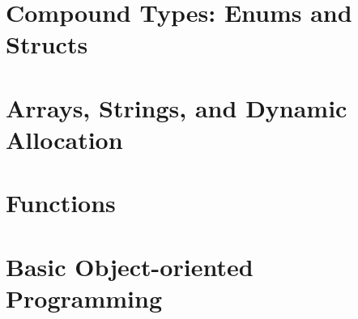 \documentclass[UTF8]{ctexart}
\begin{document}
\newpage

\section{Compound Types: Enums and Structs}












\newpage

\section{Arrays, Strings, and Dynamic Allocation}















\newpage

\section{Functions}









\newpage

\section{Basic Object-oriented Programming}
\end{document}
